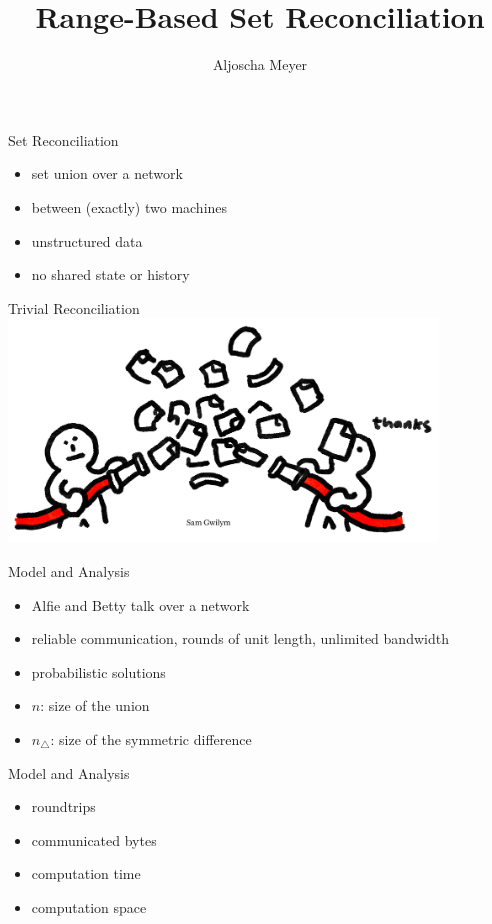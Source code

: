 \documentclass{beamer}
\title[RBSR]{Range-Based Set Reconciliation}
\author{Aljoscha Meyer}
\date{}
\begin{document}
\frame{\titlepage}

\begin{frame}{Set Reconciliation}
    \begin{itemize}
        \item set union over a network
        \item between (exactly) two machines
        \item unstructured data
        \item no shared state or history
    \end{itemize}
\end{frame}

\begin{frame}{Trivial Reconciliation}
    \includegraphics[keepaspectratio=true,width=11.4cm]{trivial_sync.png}
\end{frame}

\begin{frame}{Model and Analysis}
    \begin{itemize}
        \item Alfie and Betty talk over a network
        \item reliable communication, rounds of unit length, unlimited bandwidth
        \item probabilistic solutions \pause
        \item $n$: size of the union
        \item $n_{\triangle}$: size of the symmetric difference
    \end{itemize}
\end{frame}

\begin{frame}{Model and Analysis}
    \begin{itemize}
        \item roundtrips
        \item communicated bytes
        \item computation time
        \item computation space
    \end{itemize}
\end{frame}
\end{document}

